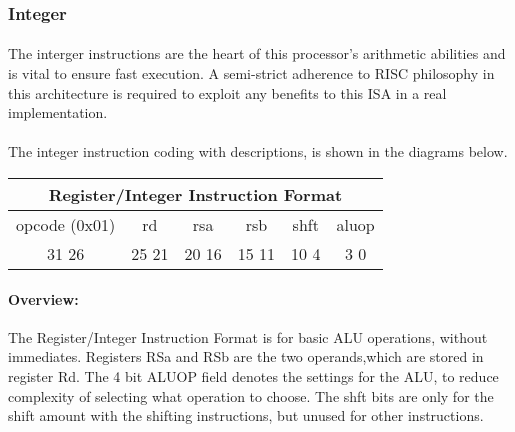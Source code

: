 \documentclass[letterpaper, 11pt]{article}
\begin{document}
\newpage
\subsubsection{Integer}
\paragraph{}The interger instructions are the heart of this processor's arithmetic abilities and is vital to ensure fast execution. A semi-strict
adherence to RISC philosophy in this architecture is required to exploit any benefits to this ISA in a real implementation.
\paragraph{}The integer instruction coding with descriptions, is shown in the diagrams below.

\begin{center}
		\begin{tabular}{|c|c|c|c|c|c|}
			\multicolumn{6}{c}{Register/Integer Instruction Format}\\ \hline
				\hspace{2pt} opcode (0x01) \hspace{2pt} & \hspace{5pt} rd \hspace{5pt} &  \hspace{4pt} rsa \hspace{4pt} & \hspace{4pt}rsb  \hspace{4pt}& \hspace{10pt}shft  \hspace{10pt} & \hspace{3pt} aluop \hspace{3pt}   \\	\hline
			31 \hfill 26& 25 \hfill 21 &20 \hfill  16& 15 \hfill  11&10 \hfill   4&3 \hfill   0\\ \hline
		
	\end{tabular}
\end{center}	
\paragraph{Overview:}The Register/Integer Instruction Format is for basic ALU operations, without immediates. Registers RSa and RSb are the two operands,which
are stored in register Rd. The 4 bit ALUOP field denotes the settings for the ALU, to reduce complexity of selecting what operation to choose.
The shft bits are only for the shift amount with the shifting instructions, but unused for other instructions. 
\end{document}

